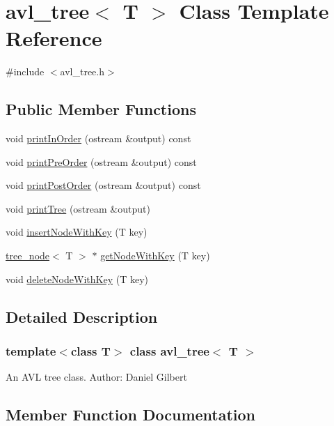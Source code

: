 \hypertarget{classavl__tree}{}\section{avl\+\_\+tree$<$ T $>$ Class Template Reference}
\label{classavl__tree}


{\ttfamily \#include $<$avl\+\_\+tree.\+h$>$}

\subsection*{Public Member Functions}
\begin{DoxyCompactItemize}
\item 
void \hyperlink{classavl__tree_ac7f553c3883b66f7758a71697bae5118}{print\+In\+Order} (ostream \&output) const
\item 
void \hyperlink{classavl__tree_a789673966eca817f4efbf6bf17644c80}{print\+Pre\+Order} (ostream \&output) const
\item 
void \hyperlink{classavl__tree_a982fc15291d6a645964a9e7743383004}{print\+Post\+Order} (ostream \&output) const
\item 
void \hyperlink{classavl__tree_aedc1c7577f8239f7b5ac939b6291fadd}{print\+Tree} (ostream \&output)
\item 
void \hyperlink{classavl__tree_afece250225096dba051bd467e89b3657}{insert\+Node\+With\+Key} (T key)
\item 
\hyperlink{classtree__node}{tree\+\_\+node}$<$ T $>$ $\ast$ \hyperlink{classavl__tree_acc15be343ae8c57859902e5e2b55c2a2}{get\+Node\+With\+Key} (T key)
\item 
void \hyperlink{classavl__tree_a2ed74e7f2e93edea90c5867ec127086f}{delete\+Node\+With\+Key} (T key)
\end{DoxyCompactItemize}


\subsection{Detailed Description}
\subsubsection*{template$<$class T$>$\newline
class avl\+\_\+tree$<$ T $>$}

An A\+VL tree class. Author\+: Daniel Gilbert 

\subsection{Member Function Documentation}
\mbox{\label{classavl__tree_a2ed74e7f2e93edea90c5867ec127086f}} 
